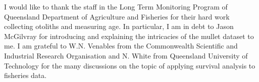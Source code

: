 I would like to thank the staff in the Long Term Monitoring Program of Queensland Department of Agriculture and Fisheries for their hard work collecting otoliths and measuring age. In particular, I am in debt to Jason McGilvray for introducing and explaining the intricacies of the mullet dataset to me. I am grateful to W.N. Venables from the Commonwealth Scientific and Industrial Research Organisation and N. White from Queensland University of Technology for the many discussions on the topic of applying survival analysis to fisheries data. 

